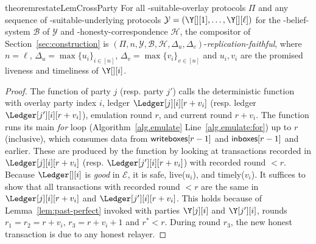 \begin{restatable}[Replication]{theorem}{restateLemCrossParty}\label{thm:replication}
  For all \rollerblade-suitable-overlay protocols $\Pi$
  and any sequence of \rollerblade-suitable-underlying
  protocols $\mathcal{Y} = (\Y[][1], \ldots, \Y[][\ell])$
  for the \rollerblade-belief-system $\mathcal{B}$ of $\mathcal{Y}$
  and \rollerblade-honesty-correspondence $\mathcal{H}$,
  the compositor \rollerblade of Section~\ref{sec:construction} is
  $(\Pi, n, \mathcal{Y}, \mathcal{B}, \mathcal{H}, \Delta_u, \Delta_v)$-\emph{replication-faithful},
  where $n = \ell$, $\Delta_u = \max\{u_i\}_{i \in [n]}$,
  $\Delta_v = \max\{v_i\}_{v \in [n]}$
  and $u_i, v_i$ are the promised liveness and timeliness of $\Y[][i]$.
\end{restatable}
\begin{proof}
  The function \emulationSnapshot of party $j$ (resp. party $j'$)
  calls the deterministic function \emulate with overlay party index $i$,
  ledger $\Ledger[j][i][r + v_i]$ (resp. ledger $\Ledger[j'][i][r + v_i]$), emulation round
  $r$, and current round $r + v_i$. The function \emulate runs its main
  \emph{for} loop (Algorithm~\ref{alg.emulate} Line~\ref{alg.emulate:for})
  up to $r$ (inclusive), which consumes data from $\textsf{writeboxes}[r - 1]$
  and $\textsf{inboxes}[r - 1]$ and earlier. These are produced by the function
  \prepareEmulationInputs by looking at transactions recorded in $\Ledger[j][i][r + v_i]$
  (resp. $\Ledger[j'][i][r + v_i]$) with recorded round $< r$.
  Because $\Ledger[][i]$ is \emph{good} in $\mathcal{E}$, it is safe, live($u_i$), and timely($v_i$).
  It suffices to show that all transactions with recorded round
  $< r$ are the same in $\Ledger[j][i][r + v_i]$ and $\Ledger[j'][i][r + v_i]$.
  This holds because of Lemma~\ref{lem:past-perfect} invoked with parties $\Y[j][i]$ and $\Y[j'][i]$,
  rounds $r_1 = r_2 = r + v_i$, $r_3 = r + v_i + 1$ and $r^* < r$.
  During round $r_3$, the new honest transaction is due to any honest
  relayer.\Qed
\end{proof}

